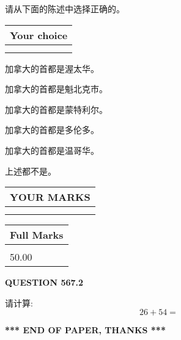 \documentclass{ctexart}
\begin{document}
  
请从下面的陈述中选择正确的。
  
  
\noindent\hspace{3.0in} \begin{tabular}{|l|}
\hline
Your choice \\
\hline
 \\ 
 \\ 
\hline
\end{tabular}
  
  
 
 
加拿大的首都是渥太华。
 
 
加拿大的首都是魁北克市。
 
 
加拿大的首都是蒙特利尔。
 
 
加拿大的首都是多伦多。
 
 
加拿大的首都是温哥华。
 
 
 上述都不是。
 
 
  
\vspace{0.2in}
  
\noindent\begin{tabular}{|l|}
\hline
 YOUR MARKS  \\
\hline
 \\ 
 \\ 
\hline
\end{tabular}
\hspace{0.05in} \begin{tabular}{|l|}
\hline
 Full Marks  \\
\hline
 \\ 
50.00 \\
\hline
\end{tabular}
{\textbf{\Large{QUESTION
567.2 
}}}
  
  
 
请计算:
\begin{equation}
26 +  %
54 = \nonumber
\end{equation}
 

 

 
   
   
 \vspace{0.2in}
 
   
   
   
   
\vspace{1.0in} 
{\textbf{\large{ *** END OF PAPER, THANKS *** }}} 
   
\end{document}
